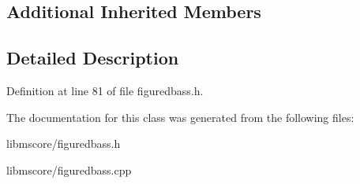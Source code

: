 \subsection*{Additional Inherited Members}


\subsection{Detailed Description}


Definition at line 81 of file figuredbass.\+h.



The documentation for this class was generated from the following files\+:\begin{DoxyCompactItemize}
\item 
libmscore/figuredbass.\+h\item 
libmscore/figuredbass.\+cpp\end{DoxyCompactItemize}
